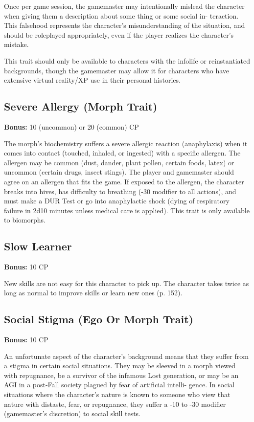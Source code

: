 Once per game session, the gamemaster may intentionally mislead the character when giving them a description about some thing or some social in- teraction. This falsehood represents the character’s misunderstanding of the situation, and should be roleplayed appropriately, even if the player realizes the character’s mistake. 

This trait should only be available to characters with the infolife or reinstantiated backgrounds, though the gamemaster may allow it for characters who have extensive virtual reality/XP use in their personal histories. 

\subsection{Severe Allergy (Morph Trait)} \label{sec:traits-severe-allergy} 

\textbf{Bonus:} 10 (uncommon) or 20 (common) CP 

The morph’s biochemistry suffers a severe allergic reaction (anaphylaxis) when it comes into contact (touched, inhaled, or ingested) with a specific allergen. The allergen may be common (dust, dander, plant pollen, certain foods, latex) or uncommon (certain drugs, insect stings). The player and gamemaster should agree on an allergen that fits the game. If exposed to the allergen, the character breaks into hives, has difficulty to breathing (-30 modifier to all actions), and must make a DUR Test or go into anaphylactic shock (dying of respiratory failure in 2d10 minutes unless medical care is applied). This trait is only available to biomorphs. 

\subsection{Slow Learner} \label{sec:traits-slow-learner} 

\textbf{Bonus:} 10 CP 

New skills are not easy for this character to pick up. The character takes twice as long as normal to improve skills or learn new ones (p. 152). 

\subsection{Social Stigma (Ego Or Morph Trait)} \label{sec:traits-social-stigma} 

\textbf{Bonus:} 10 CP 

An unfortunate aspect of the character’s background means that they suffer from a stigma in certain social situations. They may be sleeved in a morph viewed with repugnance, be a survivor of the infamous Lost generation, or may be an AGI in a post-Fall society plagued by fear of artificial intelli- gence. In social situations where the character’s nature is known to someone who view that nature with distaste, fear, or repugnance, they suffer a -10 to -30 modifier (gamemaster’s discretion) to social skill tests. 

